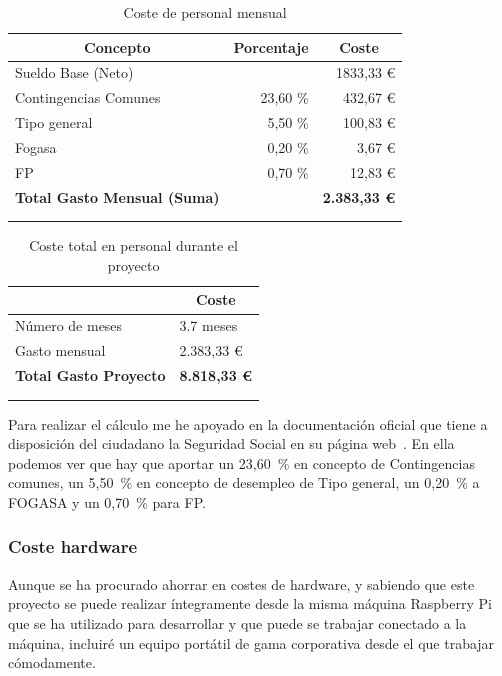 \begin{longtable}[c]{@{}lrr@{}}
\toprule
\multicolumn{1}{c}{\textbf{Concepto}} & \multicolumn{1}{c}{\textbf{Porcentaje}} & \multicolumn{1}{c}{\textbf{Coste}} \\* \midrule
\endfirsthead
%
\endhead
%
\bottomrule
\endfoot
%
\endlastfoot
%
Sueldo Base (Neto) &  & 1833,33 € \\
Contingencias Comunes & 23,60 \% & 432,67 € \\
Tipo general & 5,50 \% & 100,83 € \\
Fogasa & 0,20 \% & 3,67 € \\
FP & 0,70 \% & 12,83 € \\ \hline
\textbf{Total Gasto Mensual (Suma)} & & \textbf{2.383,33 €} \\* \bottomrule \\
\caption{Coste de personal mensual}
\label{tab:CostePersonal}
\end{longtable}


\begin{longtable}[c]{@{}ll@{}}
\toprule
\centering
\multicolumn{1}{c}{\textbf{Concepto}} & \multicolumn{1}{c}{\textbf{Coste}} \\* \midrule
\endfirsthead
%
\endhead
%
\bottomrule
\endfoot
%
\endlastfoot
%
Número de meses & 3.7 meses \\
Gasto mensual & 2.383,33 € \\ \hline
\textbf{Total Gasto Proyecto} & \textbf{8.818,33 €} \\* \bottomrule \\
\caption{Coste total en personal durante el proyecto}
\label{tab:CostePersonalTotal}\\
\end{longtable}


Para realizar el cálculo me he apoyado en la documentación oficial que tiene a disposición del ciudadano la Seguridad Social en su página web~\cite{manual:SS}. En ella podemos ver que hay que aportar un 23,60~\% en concepto de Contingencias comunes, un 5,50~\% en concepto de desempleo de Tipo general, un 0,20~\% a FOGASA y un 0,70~\% para FP.



\subsubsection{Coste hardware}
Aunque se ha procurado ahorrar en costes de hardware, y sabiendo que este proyecto se puede realizar íntegramente desde la misma máquina Raspberry Pi que se ha utilizado para desarrollar y que puede se trabajar conectado a la máquina, incluiré un equipo portátil de gama corporativa desde el que trabajar cómodamente.


